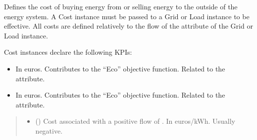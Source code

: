 \documentclass[letterpaper,10pt,english]{sphinxmanual}
\begin{document}
\begin{fulllineitems}
\label{\detokenize{generated/tamos.elementIO.Cost:tamos.elementIO.Cost}}
\pysigstartsignatures
{}
\pysigstopsignatures{}

\begin{fulllineitems}
\label{\detokenize{generated/tamos.elementIO.Cost:tamos.elementIO.Cost.__init__}}
\pysigstartsignatures
{}
\pysigstopsignatures
\sphinxAtStartPar
Defines the cost of buying energy from or selling energy to the outside of the energy system.
A Cost instance must be passed to a Grid or Load instance to be effective.
All costs are defined relatively to the flow of the  attribute of the Grid or Load instance.

\sphinxAtStartPar
Cost instances declare the following KPIs:
\begin{itemize}
\item {} 
\sphinxAtStartPar
{}
In euros.
Contributes to the “Eco” objective function. Related to the  attribute.

\item {} 
\sphinxAtStartPar
{}
In euros.
Contributes to the “Eco” objective function. Related to the  attribute.

\end{itemize}
\begin{quote}\begin{description}
\begin{itemize}
\item {} 
\sphinxAtStartPar
{} (\sphinxstyleliteralemphasis{\sphinxupquote{, }}\sphinxstyleliteralemphasis{\sphinxupquote{, }}) \textendash{} Cost associated with a positive flow of .
In euros/kWh.
Usually negative.


\end{itemize}
\end{description}
\end{quote}
\end{fulllineitems}
\end{fulllineitems}
\end{document}
